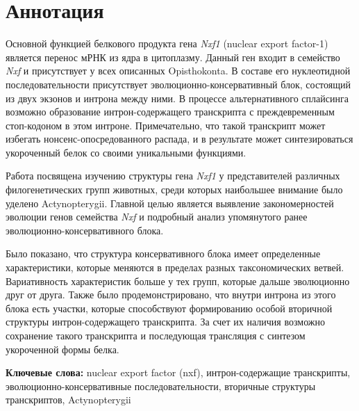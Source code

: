 \clearpage
\section{Аннотация}

Основной функцией белкового продукта гена \textit{Nxf1} (nuclear export factor-1) является перенос мРНК из ядра в цитоплазму. Данный ген входит в семейство \textit{Nxf} и присутствует у всех описанных Opisthokonta. В составе его нуклеотидной последовательности присутствует эволюционно-консервативный блок, состоящий из двух экзонов и интрона между ними. В процессе альтернативного сплайсинга возможно образование интрон-содержащего транскрипта с преждевременным стоп-кодоном в этом интроне. Примечательно, что такой транскрипт может избегать нонсенс-опосредованного распада, и в результате может синтезироваться укороченный белок со своими уникальными функциями.

Работа посвящена изучению структуры гена \textit{Nxf1} у представителей различных филогенетических групп животных, среди которых наибольшее внимание было уделено Actynopterygii. Главной целью является выявление закономерностей эволюции генов семейства \textit{Nxf} и подробный анализ упомянутого ранее эволюционно-консервативного блока.

Было показано, что структура консервативного блока имеет определенные характеристики, которые меняются в пределах разных таксономических ветвей. Вариативность характеристик больше у тех групп, которые дальше эволюционно друг от друга. Также было продемонстрировано, что внутри интрона из этого блока есть участки, которые способствуют формированию особой вторичной структуры интрон-содержащего транскрипта. За счет их наличия возможно сохранение такого транскрипта и последующая трансляция с синтезом укороченной формы белка.

\vspace{1em}

\textbf{Ключевые слова:} nuclear export factor (nxf), интрон-содержащие транскрипты, эволюционно-консервативные последовательности, вторичные структуры транскриптов, Actynopterygii